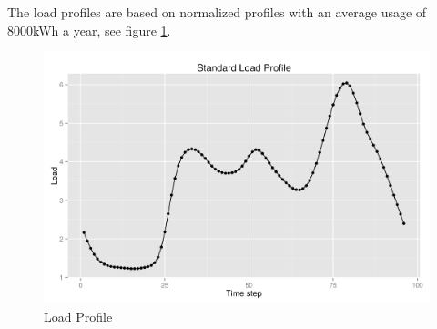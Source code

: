 \documentclass[a4paper]{article}
\begin{document}
The load profiles are based on normalized profiles with an  average usage of 8000kWh a year, see figure \ref{profile}. \\
\begin{figure}
\centering
\includegraphics[width = \textwidth]{loadprofile.png}
\caption{Load Profile}
\label{profile}
\end{figure}
\clearpage
\end{document}
